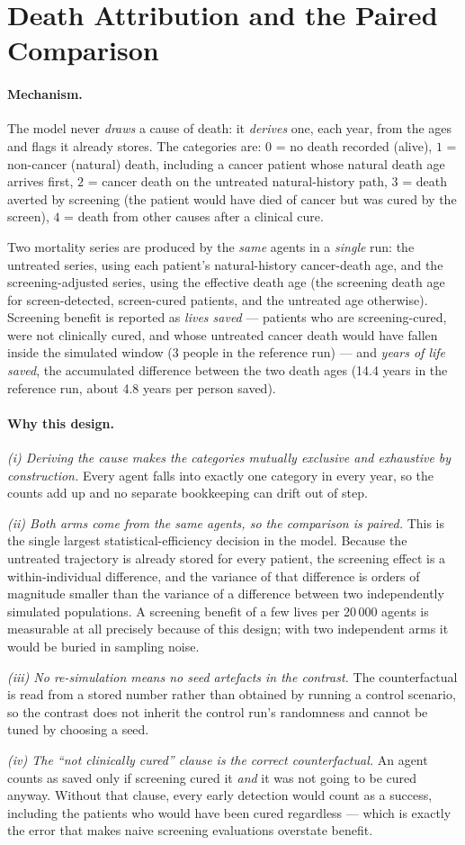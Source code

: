 \documentclass[12pt,a4paper]{article}
\newcommand{\mech}[1]{\paragraph{Mechanism.} #1}
\newcommand{\why}[1]{\paragraph{Why this design.} #1}
\begin{document}
\section{Death Attribution and the Paired Comparison}
\label{sec:death}

\mech{The model never \emph{draws} a cause of death: it \emph{derives} one, each year, from the ages and
flags it already stores. The categories are: $0$ = no death recorded (alive), $1$ = non-cancer (natural)
death, including a cancer patient whose natural death age arrives first, $2$ = cancer death on the untreated
natural-history path, $3$ = death averted by screening (the patient would have died of cancer but was cured
by the screen), $4$ = death from other causes after a clinical cure.

Two mortality series are produced by the \emph{same} agents in a \emph{single} run: the untreated series,
using each patient's natural-history cancer-death age, and the screening-adjusted series, using the
effective death age (the screening death age for screen-detected, screen-cured patients, and the untreated
age otherwise). Screening benefit is reported as \emph{lives saved} --- patients who are screening-cured,
were not clinically cured, and whose untreated cancer death would have fallen inside the simulated window
(3 people in the reference run) --- and \emph{years of life saved}, the accumulated difference between the
two death ages (14.4 years in the reference run, about 4.8 years per person saved).}

\why{\emph{(i) Deriving the cause makes the categories mutually exclusive and exhaustive by construction.}
Every agent falls into exactly one category in every year, so the counts add up and no separate bookkeeping
can drift out of step.

\emph{(ii) Both arms come from the same agents, so the comparison is paired.} This is the single largest
statistical-efficiency decision in the model. Because the untreated trajectory is already stored for every
patient, the screening effect is a within-individual difference, and the variance of that difference is
orders of magnitude smaller than the variance of a difference between two independently simulated
populations. A screening benefit of a few lives per 20\,000 agents is measurable at all precisely because
of this design; with two independent arms it would be buried in sampling noise.

\emph{(iii) No re-simulation means no seed artefacts in the contrast.} The counterfactual is read from a
stored number rather than obtained by running a control scenario, so the contrast does not inherit the
control run's randomness and cannot be tuned by choosing a seed.

\emph{(iv) The ``not clinically cured'' clause is the correct counterfactual.} An agent counts as saved only
if screening cured it \emph{and} it was not going to be cured anyway. Without that clause, every early
detection would count as a success, including the patients who would have been cured regardless --- which
is exactly the error that makes naive screening evaluations overstate benefit.}
\end{document}
